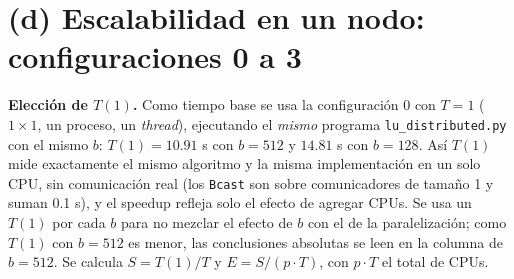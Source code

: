 \documentclass[11pt,a4paper]{article}
\begin{document}
\section{(d) Escalabilidad en un nodo: configuraciones 0 a 3}
\textbf{Elección de $T(1)$.} Como tiempo base se usa la configuración 0 con $T=1$ ($1\times1$, un proceso, un \emph{thread}), ejecutando el \emph{mismo} programa \texttt{lu\_distributed.py} con el mismo $b$: $T(1)=10.91$ s con $b=512$ y $14.81$ s con $b=128$. Así $T(1)$ mide exactamente el mismo algoritmo y la misma implementación en un solo CPU, sin comunicación real (los \texttt{Bcast} son sobre comunicadores de tamaño 1 y suman 0.1 s), y el speedup refleja solo el efecto de agregar CPUs. Se usa un $T(1)$ por cada $b$ para no mezclar el efecto de $b$ con el de la paralelización; como $T(1)$ con $b=512$ es menor, las conclusiones absolutas se leen en la columna de $b=512$. Se calcula $S=T(1)/T$ y $E=S/(p\cdot T)$, con $p\cdot T$ el total de CPUs.
\end{document}
